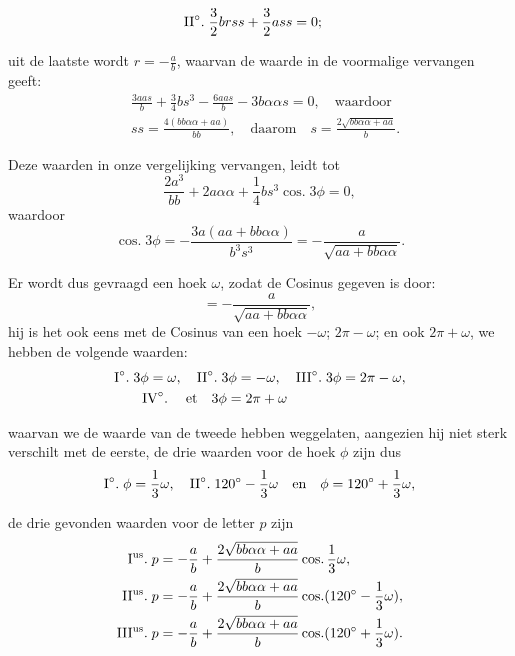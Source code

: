 \documentclass[10pt,a4paper]{article}
\DeclareMathOperator{\cosg}{cos.}
\begin{document}
\begin{paracol}{2}
\begin{enumerate}[topsep=1px]
\begin{align*}
			\text{II}\degree.\;& \frac{3}{2}brss+\frac{3}{2}ass = 0;
		\end{align*}
		\par uit de laatste wordt $r=-\frac{a}{b}$, waarvan de waarde in de voormalige vervangen geeft:
		\begin{align*}
			&\frac{3aas}{b}+\frac{3}{4}bs^3-\frac{6aas}{b}-3b\alpha \alpha s = 0, \quad \text{waardoor}\\
			&ss = \frac{4(bb\alpha \alpha + aa)}{bb}, \quad \text{daarom} \quad s = \frac{2\sqrt{bb\alpha \alpha + aa}}{b}.
		\end{align*}
		\par Deze waarden in onze vergelijking vervangen, leidt tot
		\[
			\frac{2a^3}{bb}+2a\alpha \alpha + \frac{1}{4}bs^3\cosg 3\phi = 0,
		\]
		waardoor
		\[
			\cosg 3\phi = - \frac{3a(aa + bb\alpha \alpha)}{b^3s^3} =-\frac{a}{\sqrt{aa+bb\alpha \alpha}}.
		\]
		\par Er wordt dus gevraagd een hoek $\omega$, zodat de Cosinus gegeven is door: 
		\[
			= -\frac{a}{\sqrt{aa+bb\alpha \alpha}},
		\]
		hij is het ook eens met de Cosinus van een hoek $-\omega$; $2\pi - \omega$; en ook $2\pi+\omega$, we hebben de volgende waarden:
		\begin{align*}
			&\text{I}\degree.\;3\phi = \omega, \quad \text{II}\degree.\; 3\phi = -\omega, \quad \text{III}\degree.\; 3\phi = 2\pi - \omega, \\
			&\qquad \text{IV}\degree.\; \quad \text{et} \quad 3\phi = 2\pi+\omega
		\end{align*}
		
		\par waarvan we de waarde van de tweede hebben weggelaten, aangezien hij niet sterk verschilt met de eerste, de drie waarden voor de hoek $\phi$ zijn dus
		\[
			\text{I}\degree.\; \phi = \frac{1}{3}\omega, \quad \text{II}\degree.\; 120\degree - \frac{1}{3}\omega \quad \text{en}\quad  \phi = 120\degree +\frac{1}{3}\omega,
		\]
		\par de drie gevonden waarden voor de letter $p$ zijn
		\begin{align*}
			\text{I\textsuperscript{us}.}\;  p &= -\frac{a}{b}+\frac{2\sqrt{bb\alpha \alpha + aa}}{b} \cosg \frac{1}{3} \omega,\\
			\text{II\textsuperscript{us}.}\; p &= -\frac{a}{b}+\frac{2\sqrt{bb\alpha \alpha + aa}}{b} \cosg (120\degree - \frac{1}{3}\omega),\\
			\text{III\textsuperscript{us}.}\; p & = -\frac{a}{b}+\frac{2\sqrt{bb\alpha \alpha+aa}}{b} \cosg (120\degree + \frac{1}{3}\omega).
		\end{align*}
		

\end{enumerate}
\end{paracol}
\end{document}
